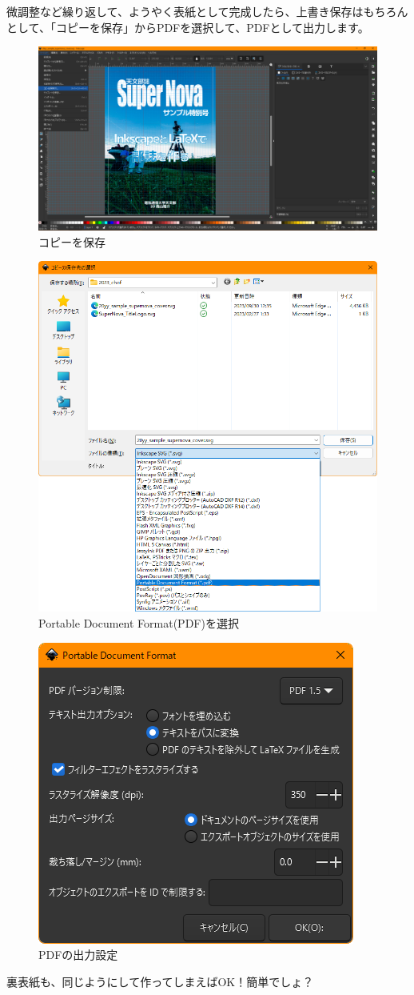 \documentclass[../super_nova_20yy]{subfiles}
\begin{document}
微調整など繰り返して、ようやく表紙として完成したら、上書き保存はもちろんとして、「コピーを保存」からPDFを選択して、PDFとして出力します。
\begin{figure}[H]
  \centering
  \includegraphics[width=.5\textwidth]{figures/ss270.png}
  \caption{コピーを保存}
  \label{fig:ss270}
\end{figure}
\begin{figure}[H]
  \centering
  \includegraphics[width=.5\textwidth]{figures/ss272.png}
  \caption{Portable Document Format(PDF)を選択}
  \label{fig:ss272}
\end{figure}
\begin{figure}[H]
  \centering
  \includegraphics[width=.5\textwidth]{figures/ss273.png}
  \caption{PDFの出力設定}
  \label{fig:ss273}
\end{figure}
裏表紙も、同じようにして作ってしまえばOK！簡単でしょ？
\end{document}
